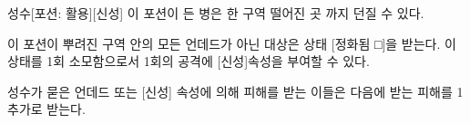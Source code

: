 \documentclass{report}
\begin{document}
	\begin{story}{성수}{[포션: 활용][신성]}
		이 포션이 든 병은 한 구역 떨어진 곳 까지 던질 수 있다.
		
		이 포션이 뿌려진 구역 안의 모든 언데드가 아닌 대상은 상태 [정화됨 □]을 받는다. 이 상태를 1회 소모함으로서 1회의 공격에 [신성]속성을 부여할 수 있다.
		
		성수가 묻은 언데드 또는 [신성] 속성에 의해 피해를 받는 이들은 다음에 받는 피해를 1 추가로 받는다.
		
	\end{story}
\end{document}
